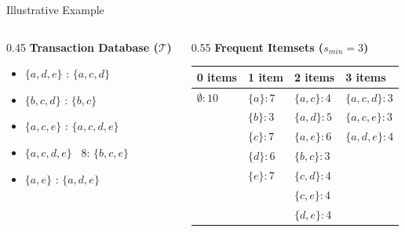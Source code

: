 \begin{frame}{Illustrative Example}
    \begin{columns}
        \begin{column}{0.45\textwidth}
            \textbf{Transaction Database ($\mathcal{T}$)}
            \footnotesize
            \begin{itemize}
                \item[0:] $\{a, d, e\}$ : $\{a, c, d\}$
                \item[1:] $\{b, c, d\}$ : $\{b, c\}$
                \item[2:] $\{a, c, e\}$ : $\{a, c, d, e\}$
                \item[3:] $\{a, c, d, e\}$ \ 8: $\{b, c, e\}$
                \item[4:] $\{a, e\}$ : $\{a, d, e\}$
            \end{itemize}
        \end{column}
        
        \begin{column}{0.55\textwidth}
            \textbf{Frequent Itemsets ($s_{min} = 3$)}
            \scriptsize
            \begin{table}
                \centering
                \begin{tabular}{|l|l|l|l|}
                \hline
                \textbf{0 items} & \textbf{1 item} & \textbf{2 items} & \textbf{3 items} \\ \hline
                $\emptyset: 10$ & $\{a\}: 7$ & $\{a, c\}: 4$ & $\{a, c, d\}: 3$ \\
                                & $\{b\}: 3$ & $\{a, d\}: 5$ & $\{a, c, e\}: 3$ \\
                                & $\{c\}: 7$ & $\{a, e\}: 6$ & $\{a, d, e\}: 4$ \\
                                & $\{d\}: 6$ & $\{b, c\}: 3$ & \\
                                & $\{e\}: 7$ & $\{c, d\}: 4$ & \\
                                &            & $\{c, e\}: 4$ & \\
                                &            & $\{d, e\}: 4$ & \\ \hline
                \end{tabular}
            \end{table}
        \end{column}
    \end{columns}
\end{frame}

